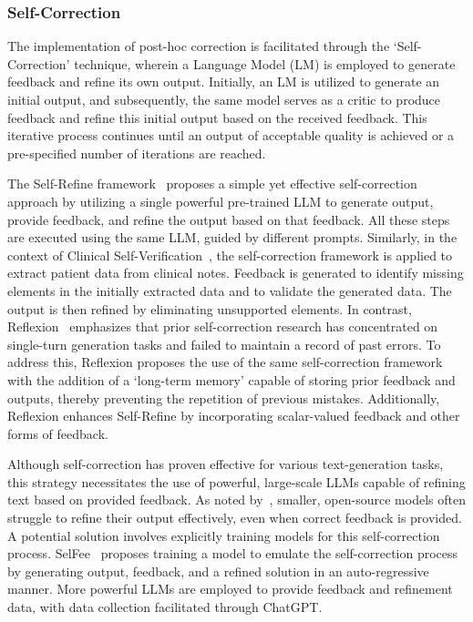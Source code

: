 \documentclass[12pt]{extarticle}
\begin{document}
\subsubsection{Self-Correction}
The implementation of post-hoc correction is facilitated through the `Self-Correction' technique, wherein a Language Model (LM) is employed to generate feedback and refine its own output. Initially, an LM is utilized to generate an initial output, and subsequently, the same model serves as a critic to produce feedback and refine this initial output based on the received feedback. This iterative process continues until an output of acceptable quality is achieved or a pre-specified number of iterations are reached.

The Self-Refine framework~\cite{madaan2023selfrefine} proposes a simple yet effective self-correction approach by utilizing a single powerful pre-trained LLM to generate output, provide feedback, and refine the output based on that feedback. All these steps are executed using the same LLM, guided by different prompts. Similarly, in the context of Clinical Self-Verification~\cite{gero2023selfverification}, the self-correction framework is applied to extract patient data from clinical notes. Feedback is generated to identify missing elements in the initially extracted data and to validate the generated data. The output is then refined by eliminating unsupported elements. In contrast, Reflexion~\cite{shinn2023reflexion} emphasizes that prior self-correction research has concentrated on single-turn generation tasks and failed to maintain a record of past errors. To address this, Reflexion proposes the use of the same self-correction framework with the addition of a `long-term memory' capable of storing prior feedback and outputs, thereby preventing the repetition of previous mistakes. Additionally, Reflexion enhances Self-Refine by incorporating scalar-valued feedback and other forms of feedback.

Although self-correction has proven effective for various text-generation tasks, this strategy necessitates the use of powerful, large-scale LLMs capable of refining text based on provided feedback. As noted by~\cite{madaan2023selfrefine}, smaller, open-source models often struggle to refine their output effectively, even when correct feedback is provided. A potential solution involves explicitly training models for this self-correction process. SelFee~\cite{selfee2023} proposes training a model to emulate the self-correction process by generating output, feedback, and a refined solution in an auto-regressive manner. More powerful LLMs are employed to provide feedback and refinement data, with data collection facilitated through ChatGPT.
\end{document}
